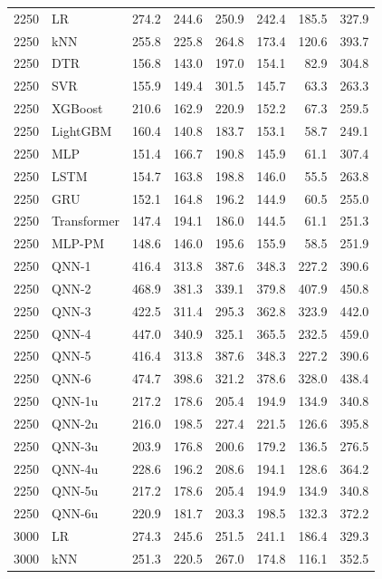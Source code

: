 \begin{longtable}{rlrrrrrr}
\midrule
2250 & LR & 274.2 & 244.6 & 250.9 & 242.4 & 185.5 & 327.9 \\
2250 & kNN & 255.8 & 225.8 & 264.8 & 173.4 & 120.6 & 393.7 \\
2250 & DTR & 156.8 & 143.0 & 197.0 & 154.1 & 82.9 & 304.8 \\
2250 & SVR & 155.9 & 149.4 & 301.5 & 145.7 & 63.3 & 263.3 \\
2250 & XGBoost & 210.6 & 162.9 & 220.9 & 152.2 & 67.3 & 259.5 \\
2250 & LightGBM & 160.4 & 140.8 & 183.7 & 153.1 & 58.7 & 249.1 \\
2250 & MLP & 151.4 & 166.7 & 190.8 & 145.9 & 61.1 & 307.4 \\
2250 & LSTM & 154.7 & 163.8 & 198.8 & 146.0 & 55.5 & 263.8 \\
2250 & GRU & 152.1 & 164.8 & 196.2 & 144.9 & 60.5 & 255.0 \\
2250 & Transformer & 147.4 & 194.1 & 186.0 & 144.5 & 61.1 & 251.3 \\
2250 & MLP-PM & 148.6 & 146.0 & 195.6 & 155.9 & 58.5 & 251.9 \\
2250 & QNN-1 & 416.4 & 313.8 & 387.6 & 348.3 & 227.2 & 390.6 \\
2250 & QNN-2 & 468.9 & 381.3 & 339.1 & 379.8 & 407.9 & 450.8 \\
2250 & QNN-3 & 422.5 & 311.4 & 295.3 & 362.8 & 323.9 & 442.0 \\
2250 & QNN-4 & 447.0 & 340.9 & 325.1 & 365.5 & 232.5 & 459.0 \\
2250 & QNN-5 & 416.4 & 313.8 & 387.6 & 348.3 & 227.2 & 390.6 \\
2250 & QNN-6 & 474.7 & 398.6 & 321.2 & 378.6 & 328.0 & 438.4 \\
2250 & QNN-1u & 217.2 & 178.6 & 205.4 & 194.9 & 134.9 & 340.8 \\
2250 & QNN-2u & 216.0 & 198.5 & 227.4 & 221.5 & 126.6 & 395.8 \\
2250 & QNN-3u & 203.9 & 176.8 & 200.6 & 179.2 & 136.5 & 276.5 \\
2250 & QNN-4u & 228.6 & 196.2 & 208.6 & 194.1 & 128.6 & 364.2 \\
2250 & QNN-5u & 217.2 & 178.6 & 205.4 & 194.9 & 134.9 & 340.8 \\
2250 & QNN-6u & 220.9 & 181.7 & 203.3 & 198.5 & 132.3 & 372.2 \\
\midrule
3000 & LR & 274.3 & 245.6 & 251.5 & 241.1 & 186.4 & 329.3 \\
3000 & kNN & 251.3 & 220.5 & 267.0 & 174.8 & 116.1 & 352.5 \\

\end{longtable}
